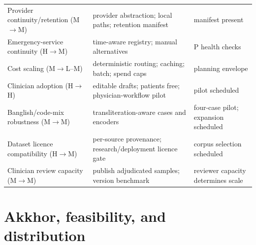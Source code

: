 \documentclass[12pt,twocolumn,a4paper]{article}
\begin{document}
\begin{table}[!t]
\begin{tabularx}{\textwidth}{@{}>{\raggedright\arraybackslash}p{3.55cm}>{\raggedright\arraybackslash}p{7.70cm}Y@{}}
Provider continuity/retention (M$\rightarrow$M) & provider abstraction; local paths; retention manifest & manifest present \\
Emergency-service continuity (H$\rightarrow$M) & time-aware registry; manual alternatives & P health checks \\
Cost scaling (M$\rightarrow$L--M) & deterministic routing; caching; batch; spend caps & planning envelope \\
Clinician adoption (H$\rightarrow$H) & editable drafts; patients free; physician-workflow pilot & pilot scheduled \\
Banglish/code-mix robustness (M$\rightarrow$M) & transliteration-aware cases and encoders & four-case pilot; expansion scheduled \\
Dataset licence compatibility (H$\rightarrow$M) & per-source provenance; research/deployment licence gate & corpus selection scheduled \\
Clinician review capacity (M$\rightarrow$M) & publish adjudicated samples; version benchmark & reviewer capacity determines scale \\
\bottomrule
\end{tabularx}
\end{table}

\section{Akkhor, feasibility, and distribution}
\end{document}
